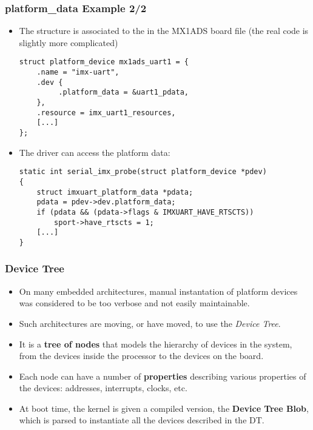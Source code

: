 \begin{frame}[fragile]
  \frametitle{platform\_data Example 2/2}
  \begin{itemize}
  \item The  structure is associated to the
     in the MX1ADS board file (the real code is
    slightly more complicated)
  \begin{verbatim}
struct platform_device mx1ads_uart1 = {
    .name = "imx-uart",
    .dev {
         .platform_data = &uart1_pdata,
    },
    .resource = imx_uart1_resources,
    [...]
};
  \end{verbatim}
  \item The driver can access the platform data:
  \begin{verbatim}
static int serial_imx_probe(struct platform_device *pdev)
{
    struct imxuart_platform_data *pdata;
    pdata = pdev->dev.platform_data;
    if (pdata && (pdata->flags & IMXUART_HAVE_RTSCTS))
        sport->have_rtscts = 1;
    [...]
}
  \end{verbatim}
\end{itemize}
\end{frame}

\begin{frame}
  \frametitle{Device Tree}
  \begin{itemize}
  \item On many embedded architectures, manual instantation of
    platform devices was considered to be too verbose and not easily
    maintainable.
  \item Such architectures are moving, or have moved, to use the {\em
      Device Tree}.
  \item It is a {\bf tree of nodes} that models the hierarchy of
    devices in the system, from the devices inside the processor to
    the devices on the board.
  \item Each node can have a number of {\bf properties} describing
    various properties of the devices: addresses, interrupts, clocks,
    etc.
  \item At boot time, the kernel is given a compiled version, the {\bf
      Device Tree Blob}, which is parsed to instantiate all the
    devices described in the DT.
  \end{itemize}
\end{frame}

